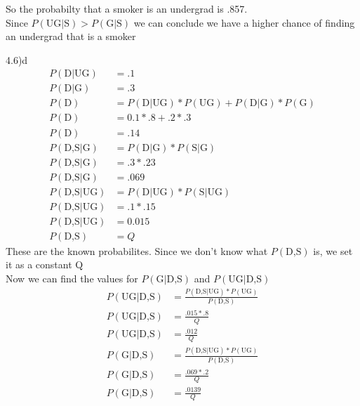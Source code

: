 \documentclass[12pt,english]{article}
\begin{document}
 So the probabilty that a smoker is an undergrad is  .857.\\
 Since $P(\mbox{UG}\vert \mbox{S}) > P(\mbox{G}\vert \mbox{S})$ 
 we can conclude we have a higher chance of finding an undergrad that is a smoker\par
 4.6)d\\
\begin{equation}
\begin{split}
P(\mbox{D}\vert \mbox{UG}) &= .1\\
P(\mbox{D}\vert \mbox{G}) &= .3\\
P(\mbox{D}) &= P(\mbox{D}\vert \mbox{UG}) * P(\mbox{UG})+ P(\mbox{D}\vert \mbox{G}) *  P(\mbox{G})\\
P(\mbox{D}) &= 0.1 * .8 + .2 * .3\\
P(\mbox{D}) &= .14\\
P(\mbox{D,S} \vert \mbox{G}) &=P(\mbox{D}\vert \mbox{G}) *P(\mbox{S}\vert \mbox{G})\\
P(\mbox{D,S} \vert \mbox{G}) &= .3 * .23\\
P(\mbox{D,S} \vert \mbox{G}) &= .069\\
P(\mbox{D,S} \vert \mbox{UG}) &=P(\mbox{D}\vert \mbox{UG}) *P(\mbox{S}\vert \mbox{UG})\\
P(\mbox{D,S} \vert \mbox{UG}) &= .1 * .15\\
P(\mbox{D,S} \vert \mbox{UG}) &=0.015\\
P(\mbox{D,S}) &= Q
\end{split}
\end{equation}
These are the known probabilites. Since we don't know what $P(\mbox{D,S})$ is, we set it as a constant Q\\
Now we can find the values for $P(\mbox{G}\vert \mbox{D,S})$ and $P(\mbox{UG}\vert \mbox{D,S})$\\
\begin{equation}
\begin{split}
P(\mbox{UG}\vert \mbox{D,S}) &=  \frac{P(\mbox{D,S} \vert \mbox{UG}) * P(\mbox{UG})}{P(\mbox{D,S})}\\
P(\mbox{UG}\vert \mbox{D,S}) &=\frac{.015 * .8}{Q}\\
P(\mbox{UG}\vert \mbox{D,S}) &=\frac{.012}{Q}\\
P(\mbox{G}\vert \mbox{D,S}) &=  \frac{P(\mbox{D,S} \vert \mbox{UG}) * P(\mbox{UG})}{P(\mbox{D,S})}\\
P(\mbox{G}\vert \mbox{D,S}) &=\frac{.069 *.2}{Q}\\
P(\mbox{G}\vert \mbox{D,S}) &=\frac{.0139}{Q}\\
\end{split}
\end{equation}
\end{document}
